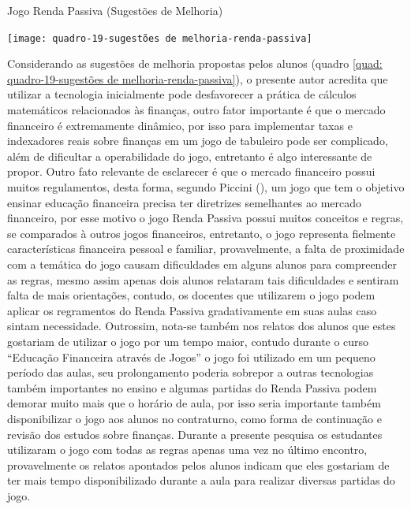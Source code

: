 \graphicspath{{quadros/}} 
\begin{quadro}[!ht]
\centering
\begin{minipage}{0.8\textwidth}
\caption{Jogo Renda Passiva (Sugestões de Melhoria)}
\centering
\texttt{[image: quadro-19-sugestões de melhoria-renda-passiva]}
\label{quad: quadro-19-sugestões de melhoria-renda-passiva}
\end{minipage}
\end{quadro}

Considerando as sugestões de melhoria propostas pelos alunos (quadro \ref{quad: quadro-19-sugestões de melhoria-renda-passiva}), o presente autor acredita que utilizar a tecnologia inicialmente pode desfavorecer a prática de cálculos matemáticos relacionados às finanças, outro fator importante é que o mercado financeiro é extremamente dinâmico, por isso para implementar taxas e indexadores reais sobre finanças em um jogo de tabuleiro pode ser complicado, além de dificultar a operabilidade do jogo, entretanto é algo interessante de propor. Outro fato relevante de esclarecer é que o mercado financeiro possui muitos regulamentos, desta forma, segundo Piccini (\citeyear{piccini2008}), um jogo que tem o objetivo ensinar educação financeira precisa ter diretrizes semelhantes ao mercado financeiro, por esse motivo o jogo Renda Passiva possui muitos conceitos e regras, se comparados à outros jogos financeiros, entretanto, o jogo representa fielmente características financeira pessoal e familiar, provavelmente, a falta de proximidade com a temática do jogo causam dificuldades em alguns alunos para compreender as regras, mesmo assim apenas dois alunos relataram tais dificuldades e sentiram falta de mais orientações, contudo, os docentes que utilizarem o jogo podem aplicar os regramentos do Renda Passiva gradativamente em suas aulas caso sintam necessidade. Outrossim, nota-se também nos relatos dos alunos que estes gostariam de utilizar o jogo por um tempo maior, contudo durante o curso “Educação Financeira através de Jogos” o jogo foi utilizado em um pequeno período das aulas, seu prolongamento poderia sobrepor a outras tecnologias também importantes no ensino e algumas partidas do Renda Passiva podem demorar muito mais que o horário de aula, por isso seria importante também disponibilizar o jogo aos alunos no contraturno, como forma de continuação e revisão dos estudos sobre finanças. Durante a presente pesquisa os estudantes utilizaram o jogo com todas as regras apenas uma vez no último encontro, provavelmente os relatos apontados pelos alunos indicam que eles gostariam de ter mais tempo disponibilizado durante a aula para realizar diversas partidas do jogo.

